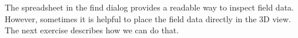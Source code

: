 



The spreadsheet in the find dialog provides a readable way to inspect field
data. However, sometimes it is helpful to place the field data directly in
the 3D view. The next exercise describes how we can do that.

